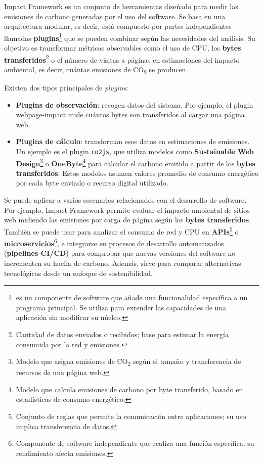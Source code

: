 \documentclass[12pt,a4paper]{report}
\begin{document}
Impact Framework es un conjunto de herramientas diseñado para medir las
emisiones de carbono generadas por el uso del software. Se basa en una
arquitectura modular, es decir, está compuesto por partes independientes
llamadas \textbf{plugins}\footnote{es un componente de software que añade una funcionalidad específica a un programa principal. Se utiliza para extender las capacidades de una aplicación sin modificar su núcleo.} que se pueden combinar según las necesidades del análisis. Su
objetivo es transformar métricas observables como el uso de CPU, los
\textbf{bytes transferidos}\footnote{Cantidad de datos enviados o recibidos;
  base para estimar la energía consumida por la red y emisiones.} o el número de
visitas a páginas en estimaciones del impacto ambiental, es decir, cuántas
emisiones de CO\textsubscript{2} se producen.

Existen dos tipos principales de \textit{plugins}:

\begin{itemize}
  \item \textbf{Plugins de observación}: recogen datos del sistema. Por ejemplo, el plugin webpage-impact mide cuántos bytes son transferidos al cargar una página web.
  \item \textbf{Plugins de cálculo}: transforman esos datos en estimaciones de emisiones. Un ejemplo es el plugin \texttt{co2js}, que utiliza modelos como \textbf{Sustainable Web Design}\footnote{Modelo que asigna emisiones de CO\textsubscript{2} según el tamaño y transferencia de recursos de una página web.} o \textbf{OneByte}\footnote{Modelo que calcula emisiones de carbono por byte transferido, basado en estadísticas de consumo energético.} para calcular el carbono emitido a partir de los \textbf{bytes transferidos}. Estos modelos asumen valores promedio de consumo energético por cada byte enviado o recurso digital utilizado.
\end{itemize}

Se puede aplicar a varios escenarios relacionados con el desarrollo de
software. Por ejemplo, Impact Framework permite evaluar el impacto ambiental de sitios web
midiendo las emisiones por carga de página según los \textbf{bytes
  transferidos}. También se puede usar
para analizar el consumo de red y CPU en \textbf{APIs}\footnote{Conjunto de
  reglas que permite la comunicación entre aplicaciones; su uso implica
  transferencia de datos.} o \textbf{microservicios}\footnote{Componente de
  software independiente que realiza una función específica; su rendimiento
  afecta emisiones.}, e integrarse en procesos de desarrollo automatizados
(\textbf{pipelines CI/CD})
para comprobar que nuevas versiones del software no incrementen su huella de
carbono. Además, sirve para comparar alternativas tecnológicas desde un enfoque
de sostenibilidad.
\end{document}
